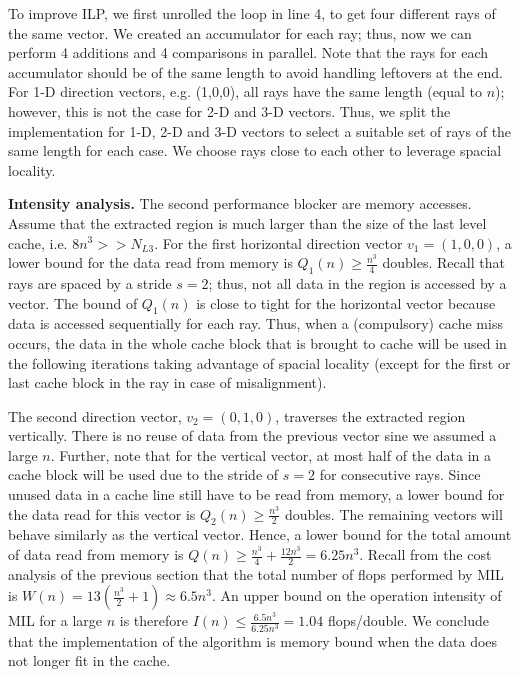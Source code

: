 \documentclass[letterpaper]{article}
\newcommand{\mypar}[1]{{\bf #1.}}
\begin{document}
To improve ILP, we first unrolled the loop in line 4, to get four different rays of the same vector. We created an accumulator for each ray; thus, now we can perform 4 additions and 4 comparisons in parallel. Note that the rays for each accumulator should be of the same length to avoid handling leftovers at the end. For 1-D direction vectors, e.g. (1,0,0), all rays have the same length (equal to $n$); however, this is not the case for 2-D and 3-D vectors. Thus, we split the implementation for 1-D, 2-D and 3-D vectors to select a suitable set of rays of the same length for each case. We choose rays close to each other to leverage spacial locality.

\mypar{Intensity analysis}
The second performance blocker are memory accesses. Assume that the extracted region is much larger than the size of the last level cache, i.e. $8n^3 >> N_{L3}$. For the first horizontal direction vector $v_1 = (1,0,0)$, a lower bound for the data read from memory is $Q_1(n) \geq \frac{n^3}{4}$ doubles. Recall that rays are spaced by a stride $s=2$; thus, not all data in the region is accessed by a vector. The bound of $Q_1(n)$ is close to tight for the horizontal vector because data is accessed sequentially for each ray. Thus, when a (compulsory) cache miss occurs, the data in the whole cache block that is brought to cache will be used in the following iterations taking advantage of spacial locality (except for the first or last cache block in the ray in case of misalignment). 

The second direction vector, $v_2 = (0,1,0)$, traverses the extracted region vertically. There is no reuse of data from the previous vector sine we assumed a large $n$. Further, note that for the vertical vector, at most half of the data in a cache block will be used due to the stride of $s=2$ for consecutive rays. Since unused data in a cache line still have to be read from memory, a lower bound for the data read for this vector is $Q_2(n) \geq \frac{n^3}{2}$ doubles. The remaining vectors will behave similarly as the vertical vector. Hence, a lower bound for the total amount of data read from memory is $Q(n) \geq \frac{n^3}{4} + \frac{12n^3}{2} = 6.25n^3$. Recall from the cost analysis of the previous section that the total number of flops performed by MIL is $W(n)=13(\frac{n^{3}}{2}+1) \approx 6.5n^3$. An upper bound on the operation intensity of MIL for a large $n$ is therefore $I(n) \leq \frac{6.5n^3}{6.25n^3} = 1.04$ flops/double. We conclude that the implementation of the algorithm is memory bound when the data does not longer fit in the cache. 
\end{document}

